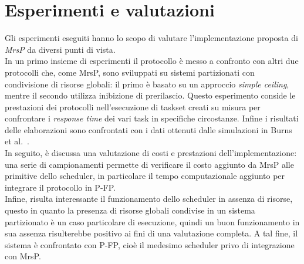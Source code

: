 











\chapter{Esperimenti e valutazioni}
\label{sec:esperimenti}

Gli esperimenti eseguiti hanno lo scopo di valutare l'implementazione proposta di \emph{MrsP} da diversi punti di vista.\\

In un primo insieme di esperimenti il protocollo è messo a confronto con altri due protocolli che, come MrsP, sono sviluppati su sistemi partizionati con condivisione di risorse globali: il primo è basato su un approccio \textit{simple ceiling}, mentre il secondo utilizza inibizione di prerilascio. Questo esperimento conside le prestazioni dei protocolli nell'esecuzione di taskset creati su misura per confrontare i \textit{response time} dei vari task in specifiche circostanze. Infine i risultati delle elaborazioni sono confrontati con i dati ottenuti dalle simulazioni in Burns et al.~\cite{Burns:2013:SCM:2547348.2547350}.\\

In seguito, è discussa una valutazione di costi e prestazioni dell'implementazione: una serie di campionamenti permette di verificare il costo aggiunto da MrsP alle primitive dello scheduler, in particolare il tempo computazionale aggiunto per integrare il protocollo in P-FP.\\

Infine, risulta interessante il funzionamento dello scheduler in assenza di risorse, questo in quanto la presenza di risorse globali condivise in un sistema partizionato è un caso particolare di esecuzione, quindi un buon funzionamento in sua assenza risulterebbe positivo ai fini di una valutazione completa. A tal fine, il sistema è confrontato con P-FP, cioè il medesimo scheduler privo di integrazione con MrsP.\\

